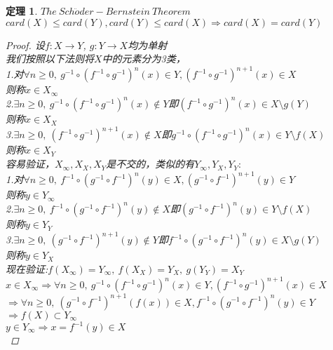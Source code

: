 \documentclass[12pt, a4paper, oneside]{ctexbook}
\newtheorem{theorem}{定理}[section]
\begin{document}
\begin{theorem}
    $The\ Sch\ddot{o}der-Bernstein\ Theorem$\\
    $card(X)\leq card(Y),card(Y)\leq card(X)\Rightarrow card(X)=card(Y)$
    \begin{proof}
        设$f:X\rightarrow Y$, $g:Y\rightarrow X$均为单射\\
        我们按照以下法则将$X$中的元素分为3类，\\
        1.对$\forall n\geq 0,\ g^{-1}\circ(f^{-1}\circ g^{-1})^{n}(x)\in Y,(f^{-1}\circ g^{-1})^{n+1}(x)\in X$\\
        则称$x\in X_{\infty}$\\
        2.$\exists n\geq 0,\ g^{-1}\circ(f^{-1}\circ g^{-1})^{n}(x)\notin Y$即$(f^{-1}\circ g^{-1})^{n}(x)\in X\setminus g(Y)$\\
        则称$x\in X_{X}$\\
        3.$\exists n\geq 0,\ (f^{-1}\circ g^{-1})^{n+1}(x)\notin X$即$g^{-1}\circ(f^{-1}\circ g^{-1})^{n}(x)\in Y\setminus f(X)$\\
        则称$x\in X_{Y}$\\
        容易验证，$X_{\infty},X_X,X_Y$是不交的，类似的有$Y_{\infty},Y_X,Y_Y:$\\
        1.对$\forall n\geq 0,\ f^{-1}\circ(g^{-1}\circ f^{-1})^{n}(y)\in X,(g^{-1}\circ f^{-1})^{n+1}(y)\in Y$\\
        则称$y\in Y_{\infty}$\\
        2.$\exists n\geq 0,\ f^{-1}\circ(g^{-1}\circ f^{-1})^{n}(y)\notin X$即$(g^{-1}\circ f^{-1})^{n}(y)\in Y\setminus f(X)$\\
        则称$y\in Y_{Y}$\\
        3.$\exists n\geq 0,\ (g^{-1}\circ f^{-1})^{n+1}(y)\notin Y$即$f^{-1}\circ(g^{-1}\circ f^{-1})^{n}(y)\in X\setminus g(Y)$\\
        则称$y\in Y_{X}$\\
        现在验证:$f(X_{\infty})=Y_{\infty},\ f(X_X)=Y_X,\ g(Y_Y)=X_Y$\\
        $x\in X_{\infty}\Rightarrow \forall n\geq 0,\ g^{-1}\circ(f^{-1}\circ g^{-1})^{n}(x)\in Y,(f^{-1}\circ g^{-1})^{n+1}(x)\in X$\\
        $\Rightarrow \forall n\geq 0,\ (g^{-1}\circ f^{-1})^{n+1}(f(x))\in X,f^{-1}\circ(g^{-1}\circ f^{-1})^{n}(y)\in Y$\\
        $\Rightarrow f(X)\subset Y_{\infty}$\\
        $y\in Y_{\infty}\Rightarrow x=f^{-1}(y)\in X$\\

\end{proof}
\end{theorem}
\end{document}
